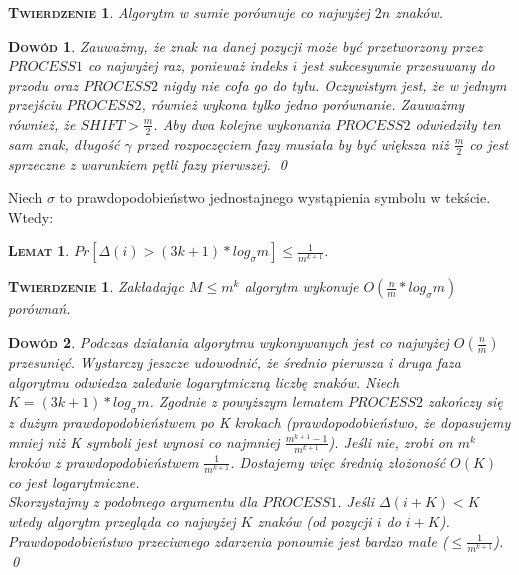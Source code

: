 \documentclass[a4paper,11pt]{article}
\newtheorem{LEM}[DEF]{\textsc{Lemat}}
\newtheorem{TW}[DEF]{\textsc{Twierdzenie}}
\newtheorem*{PROF}{\textsc{Dowód}}
\begin{document}
\begin{TW}
Algorytm w sumie porównuje co najwyżej $2n$ znaków.
\end{TW}

\begin{PROF}
Zauważmy, że znak na danej pozycji może być przetworzony przez $PROCESS1$ co najwyżej raz, ponieważ indeks $i$ jest sukcesywnie przesuwany do przodu oraz $PROCESS2$ nigdy nie cofa go do tyłu. Oczywistym jest, że w jednym przejściu $PROCESS2$, również wykona tylko jedno porównanie. Zauważmy również, że $SHIFT > \frac{m}{2}$. Aby dwa kolejne wykonania $PROCESS2$ odwiedziły ten sam znak, długość $\gamma$ przed rozpoczęciem fazy musiała by być większa niż $\frac{m}{2}$ co jest sprzeczne z warunkiem pętli fazy pierwszej. \qed
\end{PROF}

Niech $\sigma$ to prawdopodobieństwo jednostajnego wystąpienia symbolu w tekście. Wtedy:

\begin{LEM}
$Pr[\Delta(i) > (3k + 1)*log_{\sigma}m] \leq \frac{1}{m^{k+1}}$.
\end{LEM}

\begin{TW}
Zakładając $M \leq m^k$ algorytm wykonuje $O(\frac{n}{m} * log_{\sigma} m)$ porównań.
\end{TW}

\begin{PROF}
Podczas działania algorytmu wykonywanych jest co najwyżej $O(\frac{n}{m})$ przesunięć.
Wystarczy jeszcze udowodnić, że średnio pierwsza i druga faza algorytmu odwiedza zaledwie logarytmiczną liczbę znaków. Niech $K = (3k + 1) * log _{\sigma} m$. Zgodnie z powyższym lematem $PROCESS2$ zakończy się z dużym prawdopodobieństwem po K krokach (prawdopodobieństwo, że dopasujemy mniej niż K symboli jest wynosi co najmniej $\frac{m^{k + 1} - 1}{m^{k + 1}}$). Jeśli nie, zrobi on $m^k$ kroków z prawdopodobieństwem $\frac{1}{m^{k+1}}$. Dostajemy więc średnią złożoność $O(K)$ co jest logarytmiczne. \\
Skorzystajmy z podobnego argumentu dla $PROCESS1$. Jeśli $\Delta(i + K) < K$ wtedy algorytm przegląda co najwyżej $K$ znaków (od pozycji $i$ do $i+K$). Prawdopodobieństwo przeciwnego zdarzenia ponownie jest bardzo małe ($\leq \frac{1}{m^{k+1}}$). \qed
\end{PROF}
\end{document}
